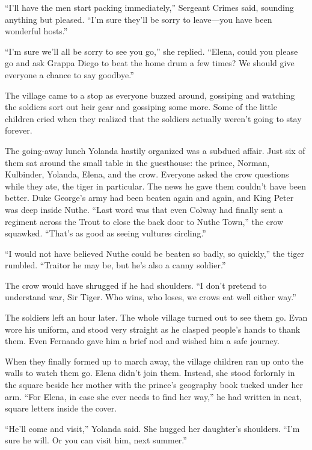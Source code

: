 \documentclass[10pt]{book}
\begin{document}
``I'll have the men start packing immediately,'' Sergeant Crimes said, sounding anything but pleased. ``I'm sure they'll be sorry to leave---you have been wonderful hosts.''

``I'm sure we'll all be sorry to see you go,'' she replied. ``Elena, could you please go and ask Grappa Diego to beat the home drum a few times? We should give everyone a chance to say goodbye.''

The village came to a stop as everyone buzzed around, gossiping and watching the soldiers sort out heir gear and gossiping some more.  Some of the little children cried when they realized that the soldiers actually weren't going to stay forever.

The going-away lunch Yolanda hastily organized was a subdued affair. Just six of them sat around the small table in the guesthouse: the prince, Norman, Kulbinder, Yolanda, Elena, and the crow. Everyone asked the crow questions while they ate, the tiger in particular. The news he gave them couldn't have been better. Duke George's army had been beaten again and again, and King Peter was deep inside Nuthe. ``Last word was that even Colway had finally sent a regiment across the Trout to close the back door to Nuthe Town,'' the crow squawked. ``That's as good as seeing vultures circling.''

``I would not have believed Nuthe could be beaten so badly, so quickly,'' the tiger rumbled. ``Traitor he may be, but he's also a canny soldier.''

The crow would have shrugged if he had shoulders. ``I don't pretend to understand war, Sir Tiger. Who wins, who loses, we crows eat well either way.''

The soldiers left an hour later. The whole village turned out to see them go. Evan wore his uniform, and stood very straight as he clasped people's hands to thank them.  Even Fernando gave him a brief nod and wished him a safe journey.

When they finally formed up to march away, the village children ran up onto the walls to watch them go. Elena didn't join them. Instead, she stood forlornly in the square beside her mother with the prince's geography book tucked under her arm. ``For Elena, in case she ever needs to find her way,'' he had written in neat, square letters inside the cover.

``He'll come and visit,'' Yolanda said. She hugged her daughter's shoulders. ``I'm sure he will. Or you can visit him, next summer.''
\end{document}
